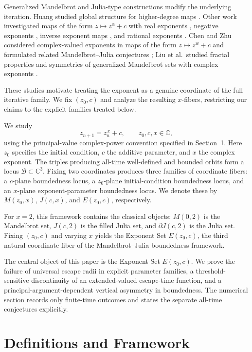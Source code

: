 \documentclass[12pt,a4paper]{amsart}
\theoremstyle{remark}
\newcommand{\C}{\mathbb{C}}
\begin{document}
Generalized Mandelbrot and Julia-type constructions modify the underlying
iteration. Huang studied global structure for higher-degree maps
\cite{huang1991global}. Other work investigated maps of the form
$z\mapsto z^\alpha+c$ with real exponents \cite{gujar1992fractal}, negative
exponents \cite{dhurandhar1993analysis}, inverse exponent maps
\cite{shirriff1993investigation}, and rational exponents
\cite{liu2013fractal}. Chen and Zhu considered complex-valued exponents in
maps of the form $z\mapsto z^w+c$ and formulated related Mandelbrot--Julia
conjectures \cite{chen1998m}; Liu et al.\ studied fractal properties and
symmetries of generalized Mandelbrot sets with complex exponents
\cite{liu2024fractal}.

These studies motivate treating the exponent as a genuine coordinate of the
full iterative family. We fix $(z_0,c)$ and analyze the resulting $x$-fibers,
restricting our claims to the explicit families treated below.

We study
\[
z_{n+1}=z_n^{\,x}+c,
\qquad z_0,c,x\in\C,
\]
using the principal-value complex-power convention specified in
Section~\ref{sec:definitions-framework}. Here $z_0$ specifies the initial condition, $c$ the additive parameter, and $x$ the complex exponent. 
The triples producing all-time well-defined and bounded orbits form a locus
$\mathcal{B}\subset\C^3$. Fixing two coordinates produces three families of
coordinate fibers: a $c$-plane boundedness locus, a $z_0$-plane
initial-condition boundedness locus, and an $x$-plane exponent-parameter
boundedness locus. We denote these by $M(z_0,x)$, $J(c,x)$, and $E(z_0,c)$,
respectively.

For $x=2$, this framework contains the classical objects: $M(0,2)$ is the
Mandelbrot set, $J(c,2)$ is the filled Julia set, and
$\partial J(c,2)$ is the Julia set. Fixing $(z_0,c)$ and varying $x$ yields the Exponent Set $E(z_0,c)$, the
third natural coordinate fiber of the Mandelbrot--Julia boundedness framework.

The central object of this paper is the Exponent Set $E(z_0,c)$. We prove the
failure of universal escape radii in explicit parameter families, a
threshold-sensitive discontinuity of an extended-valued escape-time function,
and a principal-argument-dependent vertical asymmetry in boundedness. The
numerical section records only finite-time outcomes and states the separate
all-time conjectures explicitly.

\section{Definitions and Framework}
\label{sec:definitions-framework}
\end{document}
